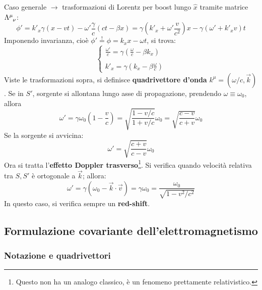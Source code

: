 \documentclass[a4paper]{scrartcl}
\numberwithin{equation}{subsection}
\theoremstyle{style1}
\begin{document}
Caso generale $\to$ trasformazioni di Lorentz per boost lungo $\hat{x}$ tramite matrice $\Lambda\indices{^\mu _\nu}$:
\[
\phi ' = k'_x \gamma(x-vt) - \omega' \frac{\gamma}{c}(ct - \beta x) = \gamma \left(k'_x + \omega' \frac{v}{c^2}\right) x - \gamma\left(\omega' + k'_x v  \right)t 
\] 
Imponendo invarianza, cio\`e $\phi '\stackrel{!}{=} \phi =k_x x - \omega t$, si trova:
\begin{equation}
	\begin{cases}
		\displaystyle \frac{\omega'}{c}= \gamma\left(\frac{\omega}{c}-\beta k_x\right) \\
		\\
		\displaystyle k'_x = \gamma\left(k_x- \beta  \frac{\omega}{c}\right) 
	\end{cases}
\end{equation}
Viste le trasformazioni sopra, si definisce \textbf{quadrivettore d'onda} $k^\mu  = (\omega / c, \vec{k})$. Se in $S'$, sorgente si allontana lungo asse di propagazione, prendendo $\omega\equiv \omega_0$, allora
\begin{equation}
	\omega' = \gamma\omega_0 \left(1- \frac{v}{c}\right) = \sqrt{\frac{1- v/c}{1+v / c}} \omega_0 = \sqrt{\frac{c-v}{c+v}} \omega_0
\end{equation}
Se la sorgente si avvicina:
\begin{equation}
	\omega' = \sqrt{\frac{c+v}{c-v}} \omega_0
\end{equation}
Ora si tratta l'\textbf{effetto Doppler trasverso}\footnote{Questo non ha un analogo classico, \`e un fenomeno prettamente relativistico.}. Si verifica quando velocit\`a relativa tra $S,S'$ \`e ortogonale a $\vec{k}$; allora:
\begin{equation}
	\omega'= \gamma(\omega_0-\vec{k}\cdot \vec{v}) = \gamma\omega_0 = \frac{\omega_0}{\sqrt{1- v^2 / c^2} }
\end{equation}
In questo caso, si verifica sempre un \textbf{red-shift}. 
\subsection{Formulazione covariante dell'elettromagnetismo}
\subsubsection{Notazione e quadrivettori}
\end{document}
